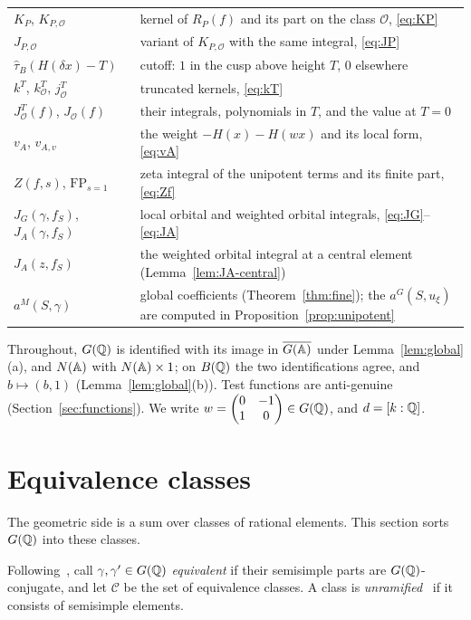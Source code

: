 \begin{center}
\begin{tabular}{p{}p{}}
$K_P$, $K_{P,\mathcal O}$ & kernel of $R_P(f)$ and its part on the class
  $\mathcal O$, \eqref{eq:KP}\\
$J_{P,\mathcal O}$ & variant of $K_{P,\mathcal O}$ with the same
  integral, \eqref{eq:JP}\\
$\hat\tau_B(H(\delta x)-T)$ & cutoff: $1$ in the cusp above height $T$,
  $0$ elsewhere\\
$k^T$, $k^T_{\mathcal O}$, $j^T_{\mathcal O}$ & truncated kernels,
  \eqref{eq:kT}\\
$J^T_{\mathcal O}(f)$, $J_{\mathcal O}(f)$ & their integrals, polynomials
  in $T$, and the value at $T=0$\\
$v_A$, $v_{A,v}$ & the weight $-H(x)-H(wx)$ and its local form,
  \eqref{eq:vA}\\
$Z(f,s)$, $\mathrm{FP}_{s=1}$ & zeta integral of the unipotent terms and
  its finite part, \eqref{eq:Zf}\\
$J_G(\gamma,f_S)$, $J_A(\gamma,f_S)$ & local orbital and weighted orbital
  integrals, \eqref{eq:JG}--\eqref{eq:JA}\\
$J_A(z,f_S)$ & the weighted orbital integral at a central element
  (Lemma~\ref{lem:JA-central})\\
$a^M(S,\gamma)$ & global coefficients (Theorem~\ref{thm:fine}); the
  $a^G(S,u_\xi)$ are computed in Proposition~\ref{prop:unipotent}
\end{tabular}
\end{center}

Throughout, $G(\mathbb{Q})$ is identified with its image in $\overline{G(\mathbb{A})}$ under
Lemma~\ref{lem:global}(a), and $N(\mathbb{A})$ with $N(\mathbb{A})\times1$; on $B(\mathbb{Q})$
the two identifications agree, and $b\mapsto(b,1)$
(Lemma~\ref{lem:global}(b)). Test functions are anti-genuine
(Section~\ref{sec:functions}). We write $w=\begin{pmatrix}0&-1\\1&0
\end{pmatrix}\in G(\mathbb{Q})$, and $d=[k:\mathbb{Q}]$.

\section{Equivalence classes}\label{sec:classes}

The geometric side is a sum over classes of rational elements. This
section sorts $G(\mathbb{Q})$ into these classes.


Following~\cite[\S2]{Ar78}, call $\gamma,\gamma'\in G(\mathbb{Q})$
\emph{equivalent} if their semisimple parts are $G(\mathbb{Q})$-conjugate, and let
$\mathcal C$ be the set of equivalence classes. A class is
\emph{unramified}~\cite[p.~949]{Ar78} if it consists of semisimple elements.

